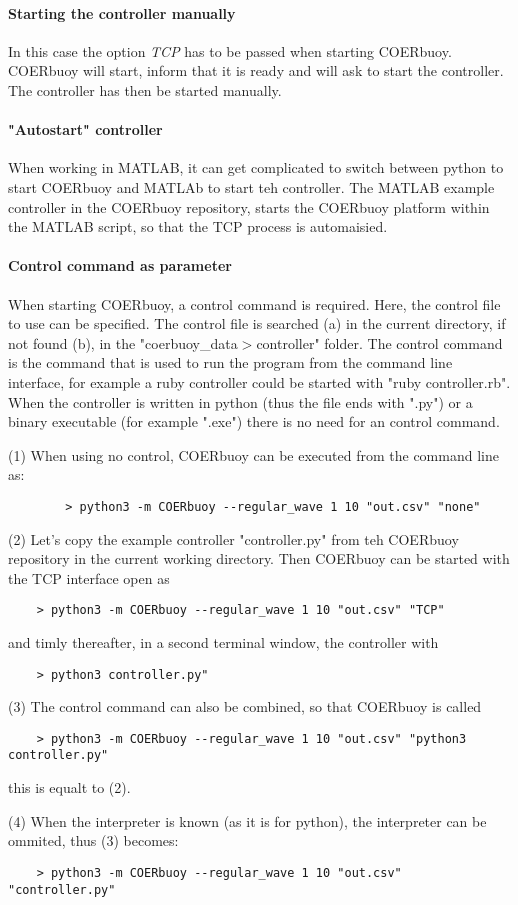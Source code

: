 \documentclass[oneside,10pt,a4paper]{book}
\begin{document}
\paragraph{Starting the controller manually}
In this case the option \textit{TCP} has to be passed when starting COERbuoy. COERbuoy will start, inform that it is ready and will ask to start the controller. The controller has then be started manually.
\paragraph{"Autostart" controller}
When working in MATLAB, it can get complicated to switch between python to start COERbuoy and MATLAb to start teh controller. The MATLAB example controller in the COERbuoy repository, starts the COERbuoy platform within the MATLAB script, so that the TCP process is automaisied.
\paragraph{Control command as parameter}
When starting COERbuoy, a control command is required. Here, the control file to use can be specified. The control file is searched (a) in the current directory, if not found (b), in the "coerbuoy\_data$>$controller" folder. The control command is the command that is used to run the program from the command line interface, for example a ruby controller could be started with "ruby controller.rb". When the controller is written in python (thus the file ends with ".py") or a binary executable (for example ".exe") there is no need for an control command.
\begin{example}
	
	(1) When using no control, COERbuoy can be executed from the command line as:
	\begin{verbatim}
		> python3 -m COERbuoy --regular_wave 1 10 "out.csv" "none"
	\end{verbatim}
(2) Let's copy the example controller "controller.py" from teh COERbuoy repository in the current working directory. Then COERbuoy can be started with the TCP interface open as
\begin{verbatim}
	> python3 -m COERbuoy --regular_wave 1 10 "out.csv" "TCP"
\end{verbatim}
and timly thereafter, in a second terminal window, the controller with
\begin{verbatim}
	> python3 controller.py"
\end{verbatim}

(3) The control command can also be combined, so that COERbuoy is called 
\begin{verbatim}
	> python3 -m COERbuoy --regular_wave 1 10 "out.csv" "python3 controller.py"
\end{verbatim}
this is equalt to (2).

(4) When the interpreter is known (as it is for python), the interpreter can be ommited, thus (3) becomes:
\begin{verbatim}
	> python3 -m COERbuoy --regular_wave 1 10 "out.csv" "controller.py"
\end{verbatim}
\end{example}
\end{document}
